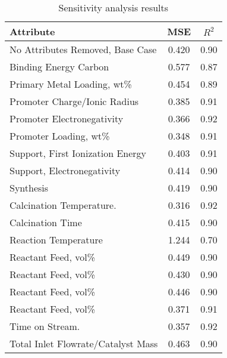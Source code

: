\begin{table}[!htbp]
	\centering
	\caption{Sensitivity analysis results}
	\label{table: sensitivity analysis}
	\begin{tabular}{lcc}
	\textbf{Attribute}                 & \textbf{MSE} & \textbf{$R^2$} \\ \hline
	No Attributes Removed, Base Case   & 0.420        & 0.90                         \\ \hline
	Binding Energy Carbon              & 0.577        & 0.87                         \\
	Primary Metal Loading, wt\%        & 0.454        & 0.89                         \\
	Promoter Charge/Ionic Radius       & 0.385        & 0.91                         \\
	Promoter Electronegativity         & 0.366        & 0.92                         \\
	Promoter Loading, wt\%             & 0.348        & 0.91                         \\
	Support, First Ionization Energy   & 0.403        & 0.91                         \\
	Support, Electronegativity         & 0.414        & 0.90                         \\
	Synthesis                          & 0.419        & 0.90                         \\
	Calcination Temperature.           & 0.316        & 0.92                         \\
	Calcination Time                   & 0.415        & 0.90                         \\ \hline
	Reaction Temperature               & 1.244        & 0.70                         \\
	Reactant Feed, \ce{H2} vol\%            & 0.449        & 0.90                         \\
	Reactant Feed, \ce{CO} vol\%            & 0.430        & 0.90                         \\
	Reactant Feed, \ce{H2O} vol\%           & 0.446        & 0.90                         \\
	Reactant Feed, \ce{CO2} vol\%           & 0.371        & 0.91                         \\
	Time on Stream.                    & 0.357        & 0.92                         \\
	Total Inlet Flowrate/Catalyst Mass & 0.463        & 0.90                        
	\end{tabular}
\end{table}
\FloatBarrier
